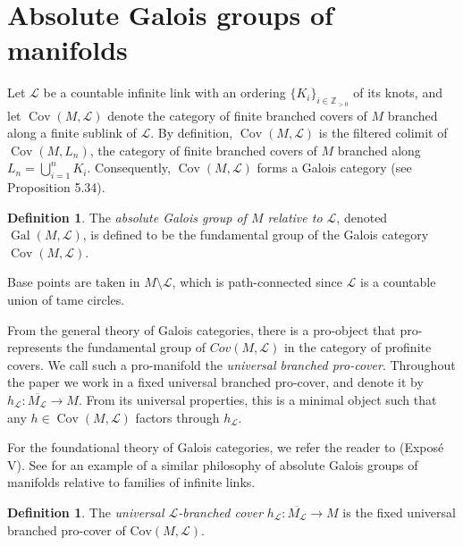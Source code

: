 \documentclass{amsart}
\theoremstyle{plain}
\theoremstyle{definition}
\newtheorem{Def}[theorem]{Definition}
\theoremstyle{plain}
\theoremstyle{plain}
\theoremstyle{plain}
\theoremstyle{remark}
\theoremstyle{remark}
\theoremstyle{plain}
\theoremstyle{definition}
\theoremstyle{plain}
\DeclareMathOperator{\Gal}{\mathrm{Gal}}
\DeclareMathOperator{\Cov}{\mathrm{Cov}}
\theoremstyle{plain}
\theoremstyle{plain}
\numberwithin{equation}{section}
\begin{document}
\section{Absolute Galois groups of manifolds}\label{sec:abs}

Let $\mathcal{L}$ be a countable infinite link with an ordering $\{K_i\}_{i\in\mathbb{Z}_{>0}}$ of its knots, and let $\Cov(M, \mathcal{L})$ denote the category of finite branched covers of $M$ branched along a finite sublink of $\mathcal{L}$. By definition, $\Cov(M, \mathcal{L})$ is the filtered colimit of $\Cov(M, L_n)$, the category of finite branched covers of $M$ branched along $L_n=\displaystyle\bigcup_{i=1}^nK_i$. Consequently, $\Cov(M, \mathcal{L})$ forms a Galois category (see \cite{mathew2016galois} Proposition 5.34). 

\begin{Def}
The \emph{absolute Galois group of $M$ relative to $\mathcal{L}$}, denoted $\Gal(M, \mathcal{L})$, is defined to be the fundamental group of the Galois category $\Cov(M, \mathcal{L})$.
\end{Def}

Base points are taken in $M \setminus \mathcal L$, which is path-connected since $\mathcal L$ is a countable union of tame circles.

\medskip

From the general theory of Galois categories, there is a pro-object that pro-represents the fundamental group of $Cov(M,\mathcal{L})$ in the category of profinite covers. We call such a pro-manifold the \emph{universal branched pro-cover}. Throughout the paper we work in a fixed universal branched pro-cover, and denote it by $h_{\mathcal{L}}: \overline{M_\mathcal{L}} \to M$. From its universal properties, this is a minimal object such that any $h \in \Cov(M, \mathcal{L})$ factors through $h_{\mathcal{L}}$.

\medskip

For the foundational theory of Galois categories, we refer the reader to \cite{sga} (Expos\'e V). See \cite{uekiniibo} for an example of a similar philosophy of absolute Galois groups of manifolds relative to families of infinite links.

\begin{Def}\label{def:universal}
The \emph{universal $\mathcal{L}$-branched cover} $h_{\mathcal{L}}: \overline{M_\mathcal{L}} \to M$ is the fixed universal branched pro-cover of $\mathrm{Cov}(M, \mathcal{L})$. 
\end{Def}
\end{document}
